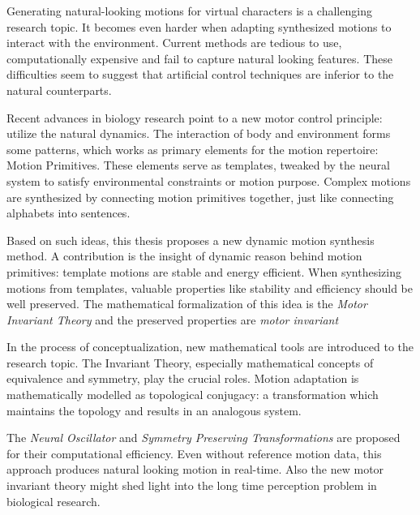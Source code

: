 


\begin{abstracts}        %

Generating natural-looking motions for virtual characters is a challenging research topic.
It becomes even harder when adapting synthesized motions to interact with the environment. 
Current methods are tedious to use, computationally expensive and fail to capture natural looking features.
These difficulties seem to suggest that artificial control techniques are inferior to the natural counterparts.

Recent advances in biology research point to a new motor control principle: utilize the natural dynamics.
The interaction of body and environment forms some patterns, which works as primary elements for the motion repertoire: Motion Primitives.
These elements serve as templates, tweaked by the neural system to satisfy  environmental constraints or motion purpose.
Complex motions are synthesized by connecting motion primitives together, just like connecting alphabets into sentences.



Based on such ideas,   this thesis proposes a new dynamic motion synthesis method.
A contribution is the insight of dynamic reason behind motion primitives: template motions are stable and energy efficient. 
When synthesizing motions from templates, valuable properties  like stability and efficiency should be well preserved.
The mathematical formalization of this idea is the \emph{Motor Invariant Theory} and the preserved properties are \emph{motor invariant}

In the process of conceptualization, new mathematical tools are introduced to the research topic.
The Invariant Theory, especially mathematical concepts of equivalence and symmetry, play the crucial roles.
Motion adaptation is mathematically modelled as topological conjugacy: a transformation which maintains the topology and results in an analogous system.

The \emph{Neural Oscillator} and \emph{Symmetry Preserving Transformations} are proposed for their computational efficiency.
Even without reference motion data, this approach produces natural looking motion in real-time.
Also the new motor invariant theory might  shed light into the long time perception problem in biological research.

\end{abstracts}





